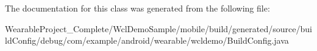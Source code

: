 The documentation for this class was generated from the following file\+:\begin{DoxyCompactItemize}
\item 
Wearable\+Project\+\_\+\+Complete/\+Wcl\+Demo\+Sample/mobile/build/generated/source/build\+Config/debug/com/example/android/wearable/wcldemo/Build\+Config.\+java\end{DoxyCompactItemize}
